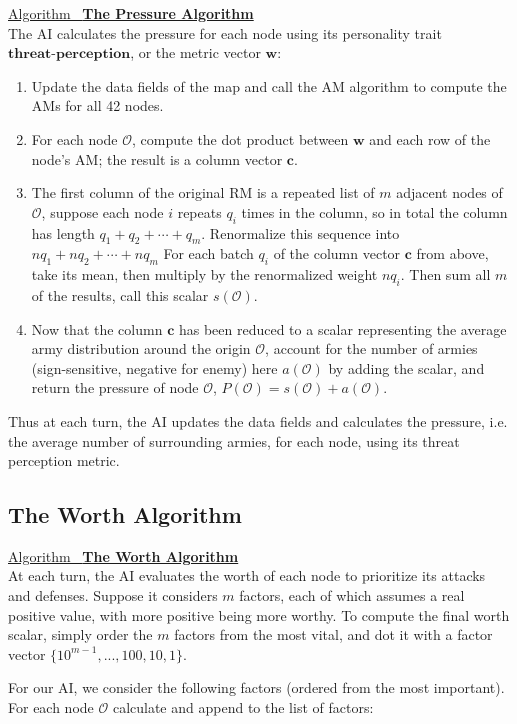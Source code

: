 \documentclass[12pt]{article}  %
\newcommand{\algtitle}[1]{\underline{Algorithm \ {\bf #1}} \vspace*{1mm}\\}
\begin{document}
\algtitle{The Pressure Algorithm}
The AI calculates the pressure for each node using its personality trait $\textbf{threat-perception}$, or the metric vector $\mathbf{w}$:
\begin{enumerate}
	\item Update the data fields of the map and call the AM algorithm to compute the AMs for all 42 nodes.
	\item For each node $\mathcal{O}$, compute the dot product between $\mathbf{w}$ and each row of the node's AM; the result is a column vector $\mathbf{c}$.
	\item The first column of the original RM is a repeated list of $m$ adjacent nodes of $\mathcal{O}$, suppose each node $i$ repeats $q_i$ times in the column, so in total the column has length $q_1 + q_2 + \cdots + q_m$. Renormalize this sequence into $nq_1 + nq_2 + \cdots + nq_m$ For each batch $q_i$ of the column vector $\mathbf{c}$ from above, take its mean, then multiply by the renormalized weight $nq_i$. Then sum all $m$ of the results, call this scalar $s(\mathcal{O})$.
	\item Now that the column $\mathbf{c}$ has been reduced to a scalar representing the average army distribution around the origin $\mathcal{O}$, account for the number of armies (sign-sensitive, negative for enemy) here $a(\mathcal{O})$ by adding the scalar, and return the pressure of node $\mathcal{O}$, $P(\mathcal{O}) = s(\mathcal{O}) + a(\mathcal{O})$.
\end{enumerate}


Thus at each turn, the AI updates the data fields and calculates the pressure, i.e. the average number of surrounding armies, for each node, using its threat perception metric.




\subsection{The Worth Algorithm}

\algtitle{The Worth Algorithm}
At each turn, the AI evaluates the worth of each node to prioritize its attacks and defenses. Suppose it considers $m$ factors, each of which assumes a real positive value, with more positive being more worthy. To compute the final worth scalar, simply order the $m$ factors from the most vital, and dot it with a factor vector $\{10^{m-1}, ..., 100, 10, 1\}$.

For our AI, we consider the following factors (ordered from the most important). For each node $\mathcal{O}$ calculate and append to the list of factors:
\end{document}
